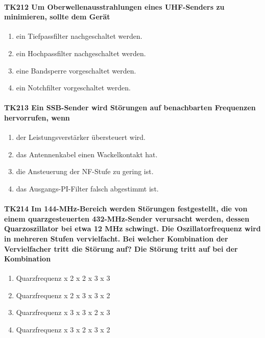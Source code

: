 \documentclass[8pt]{article}
\begin{document}
\paragraph*{TK212 Um Oberwellenausstrahlungen eines UHF-Senders zu minimieren, sollte dem Gerät}
\begin{enumerate}[nolistsep,label=\Alph*]
\item ein Tiefpassfilter nachgeschaltet werden.
\item ein Hochpassfilter nachgeschaltet werden.
\item eine Bandsperre vorgeschaltet werden.
\item ein Notchfilter vorgeschaltet werden.
\end{enumerate}

\paragraph*{TK213 Ein SSB-Sender wird Störungen auf benachbarten Frequenzen hervorrufen, wenn}
\begin{enumerate}[nolistsep,label=\Alph*]
\item der Leistungsverstärker übersteuert wird.
\item das Antennenkabel einen Wackelkontakt hat.
\item die Ansteuerung der NF-Stufe zu gering ist.
\item das Ausgangs-PI-Filter falsch abgestimmt ist.
\end{enumerate}

\paragraph*{TK214 Im 144-MHz-Bereich werden Störungen festgestellt, die von einem quarzgesteuerten 432-MHz-Sender verursacht werden, dessen Quarzoszillator bei etwa 12 MHz schwingt. Die Oszillatorfrequenz wird in mehreren Stufen vervielfacht. Bei welcher Kombination der Vervielfacher tritt die Störung auf?  Die Störung tritt auf bei der Kombination}
\begin{enumerate}[nolistsep,label=\Alph*]
\item Quarzfrequenz x 2 x 2 x 3 x 3
\item Quarzfrequenz x 2 x 3 x 3 x 2
\item Quarzfrequenz x 3 x 3 x 2 x 3
\item Quarzfrequenz x 3 x 2 x 3 x 2
\end{enumerate}
\end{document}
